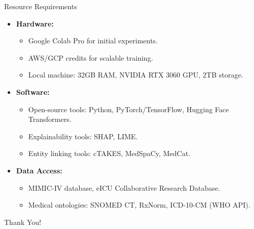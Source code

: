 \documentclass{beamer}
\begin{document}
\begin{frame}{Resource Requirements}
    \begin{itemize}
        \item \textbf{Hardware:}
        \begin{itemize}
            \item Google Colab Pro for initial experiments.
            \item AWS/GCP credits for scalable training.
            \item Local machine: 32GB RAM, NVIDIA RTX 3060 GPU, 2TB storage.
        \end{itemize}
        \item \textbf{Software:}
        \begin{itemize}
            \item Open-source tools: Python, PyTorch/TensorFlow, Hugging Face Transformers.
            \item Explainability tools: SHAP, LIME.
            \item Entity linking tools: cTAKES, MedSpaCy, MedCat.
        \end{itemize}
        \item \textbf{Data Access:}
        \begin{itemize}
            \item MIMIC-IV database, eICU Collaborative Research Database.
            \item Medical ontologies: SNOMED CT, RxNorm, ICD-10-CM (WHO API).
        \end{itemize}
    \end{itemize}
\end{frame}

\begin{frame}
    \centering
    \Huge{Thank You!}
\end{frame}
\end{document}
